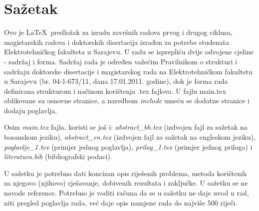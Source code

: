 \pagebreak


\section*{Sažetak}


Ovo je \LaTeX\ predložak za izradu završnih radova prvog i drugog ciklusa, magistarskih radova i doktorskih disertacija izrađen za potrebe studenata Elektrotehničkog fakulteta u Sarajevu. U radu se isprepliću dvije odvojene cjeline - sadržaj i forma. Sadržaj rada je određen važećim Pravilnikom o strukturi i sadržaju doktorske disertacije i magistarskog rada na Elektrotehničkom fakultetu u Sarajevu (br. 04-1-673/11, dana 17.01.2011. godine), dok je forma rada definirana strukturom i načinom korištenja .tex fajlova.
U fajlu main.tex oblikovane su osnovne stranice, a naredbom \textit{include} umeću se dodatne stranice i dodaju poglavlja. 

Osim \textit{main.tex} fajla, koristi se još i: \textit{abstract\_bh.tex} (izdvojen fajl za sažetak na bosanskom jeziku), \textit{abstract\_en.tex} (izdvojen fajl za sažetak na engleskom jeziku), \textit{poglavlje\_1.tex} (primjer jednog poglavlja),\textit{ prilog\_1.tex} (primjer jednog priloga) i \textit{literatura.bib} (bibliografski podaci).

U sažetku je potrebno dati koncizan opis riješenih problema, metoda korištenih za njegovo (njihovo) rješavanje, dobivenih rezultata i zaključke. U sažetku se ne navode reference. Potrebno je voditi računa da se u sažetku ne daje uvod u rad, niti pregled poglavlja rada, već daje opis namjene rada do najviše 500 riječi.

\vspace{1cm}

